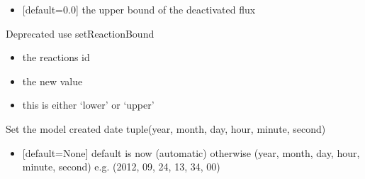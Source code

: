 \documentclass[letterpaper,10pt,english]{sphinxmanual}
\begin{document}
\begin{fulllineitems}
\begin{fulllineitems}
\begin{itemize}
\item {} 
\sphinxAtStartPar
{} {[}default=0.0{]} the upper bound of the deactivated flux

\end{itemize}

\end{fulllineitems}


\begin{fulllineitems}
\label{\detokenize{modules_doc:cbmpy.CBModel.Model.setBoundValueByName}}
\pysigstartsignatures
{}
\pysigstopsignatures
\sphinxAtStartPar
Deprecated use setReactionBound
\begin{description}
\begin{itemize}
\item {} 
\sphinxAtStartPar
{} the reactions id

\item {} 
\sphinxAtStartPar
{} the new value

\item {} 
\sphinxAtStartPar
{} this is either ‘lower’ or ‘upper’

\end{itemize}

\end{description}

\end{fulllineitems}


\begin{fulllineitems}
\label{\detokenize{modules_doc:cbmpy.CBModel.Model.setCreatedDate}}
\pysigstartsignatures
{}
\pysigstopsignatures
\sphinxAtStartPar
Set the model created date tuple(year, month, day, hour, minute, second)
\begin{itemize}
\item {} 
\sphinxAtStartPar
{} {[}default=None{]} default is now (automatic) otherwise (year, month, day, hour, minute, second) e.g. (2012, 09, 24, 13, 34, 00)


\end{itemize}
\end{fulllineitems}
\end{fulllineitems}
\end{document}

